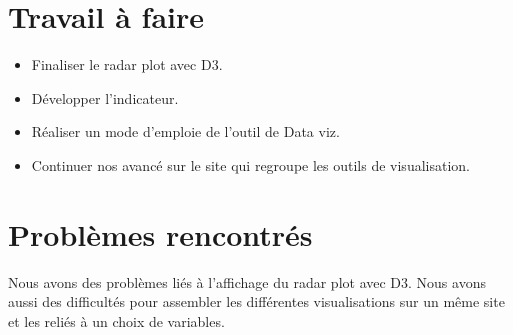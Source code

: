 \documentclass{article}
\begin{document}
\section{Travail à faire}
\begin{itemize}
    \item Finaliser le radar plot avec D3.
    \item Développer l'indicateur.
    \item Réaliser un mode d'emploie de l'outil de Data viz.
    \item Continuer nos avancé sur le site qui regroupe les outils de visualisation.
\end{itemize} 

\section{Problèmes rencontrés}
Nous avons des problèmes liés à l'affichage du radar plot avec D3. Nous avons aussi des difficultés pour assembler les différentes visualisations sur un même site et les reliés à un choix de variables.
\end{document}
